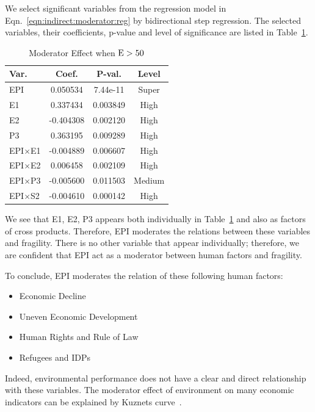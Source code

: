We select significant variables from the regression model in Eqn.~\ref{eqn:indirect:moderator:reg} by bidirectional step regression. The selected variables, their coefficients, p-value and level of significance are listed in Table~\ref{tab:exp:indirect:moderator:case1}.

\begin{table}[htbp]
    \small
    \centering
   \begin{tabular}{|l|ccc|}\hline
      Var. & Coef. & P-val. & Level \\ \hline
      EPI & 0.050534 & 7.44e-11 & Super \\ \hline
      E1 & 0.337434 & 0.003849 & High \\ \hline
      E2 & -0.404308 & 0.002120 & High \\ \hline
      P3 & 0.363195 & 0.009289 & High \\ \hline
      EPI$\times$E1 & -0.004889 & 0.006607 & High \\ \hline
      EPI$\times$E2 & 0.006458 & 0.002109 & High \\ \hline
      EPI$\times$P3 & -0.005600 & 0.011503 & Medium \\ \hline
      EPI$\times$S2 & -0.004610 & 0.000142 & High \\ \hline
   \end{tabular} 
   \caption{Moderator Effect when $\operatorname*{E} > 50$}
   \label{tab:exp:indirect:moderator:case1}
\end{table}

We see that E1, E2, P3 appears both individually in Table~\ref{tab:exp:indirect:moderator:case1} and also as factors of cross products. Therefore, EPI moderates the relations between these variables and fragility. There is no other variable that appear individually; therefore, we are confident that EPI act as a moderator between human factors and fragility.

To conclude,
EPI moderates the relation of these following human factors:
\begin{itemize}
    \item Economic Decline
    \item Uneven Economic Development
    \item Human Rights and Rule of Law
    \item Refugees and IDPs 
\end{itemize}
Indeed, environmental performance does not have a clear and direct relationship with these variables. The moderator effect of environment on many economic indicators can be explained by Kuznets curve~\cite{kuznets1955economic,kuznets1966modern}.


